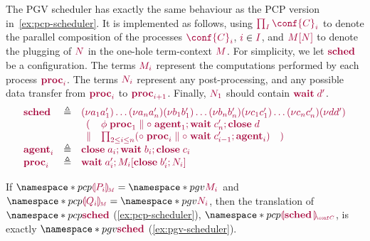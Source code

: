 \begingroup
{}
\begin{example}
  \label{ex:pgv-scheduler}
  The PGV scheduler has exactly the same behaviour as the PCP version in~\cref{ex:pcp-scheduler}. It is implemented as follows, using $\tm{\prod_{I}\conf{C}_i}$ to denote the parallel composition of the processes $\tm{\conf{C}_i}$, $\tm{i}\in\tm{I}$, and $\tm{\plug{M}{N}}$ to denote the plugging of $\tm{N}$ in the one-hole term-context $\tm{M}$. For simplicity, we let $\tm{\sched}$ be a configuration. The terms $\tm{M_i}$ represent the computations performed by each process $\tm{\proc{i}}$. The terms $\tm{N_i}$ represent any post-processing, and any possible data transfer from $\tm{\proc{i}}$ to $\tm{\proc{i+1}}$. Finally, $\tm{N_1}$ should contain $\tm{\wait\;{d'}}$.
  \[
    \begin{array}{lrlr}
      \tm{\sched}
      & \defeq & \tm{\res{a_1}{a'_1}{\dots{\res{a_n}{a'_n}{}}}}
                 \tm{\res{b_1}{b'_1}{\dots{\res{b_n}{b'_n}{}}}}
                 \tm{\res{c_1}{c'_1}{\dots{\res{c_n}{c'_n}{}}}}
                 \tm{\res{d}{d'}{}}
      \\ &     & \tm{\begin{array}{lll}
                       (
                       & \phi\;\proc1
                         \parallel
                         \child\;\andthen{\agent1}{\andthen{\wait\;{c'_n}}{\close\;{d}}}
                       \\
                       \parallel
                       &
                         \prod_{2\leq{i}\leq{n}}
                         (\child\;\proc{i} \parallel \child\;\andthen{\wait\;{c'_{i-1}}}{\agent{i}})
                       & )
                     \end{array}}
      \\
      \tm{\agent{i}}
      & \defeq & \tm{\andthen{\close\;{a_i}}{\andthen{\wait\;{b_i}}{\close\;{c_i}}}}
      \\
      \tm{\proc{i}}
      & \defeq & \tm{\andthen{\wait\;{a'_i}}{\plug{M_i}{\andthen{\close\;{b'_i}}{N_i}}}}
    \end{array}
  \]
\end{example}
\endgroup

If $\pcp{\tm{\cpgvM{P_i}}}=\pgv{\tm{M_i}}$ and $\pcp{\tm{\cpgvM{Q_i}}}=\pgv{\tm{N_i}}$, then the translation of $\pcp{\tm{\sched}}$ (\cref{ex:pcp-scheduler}), $\pcp{\tm{\cpgvC{\sched\,}}}$, is exactly $\pgv{\tm{\sched}}$ (\cref{ex:pgv-scheduler}).


